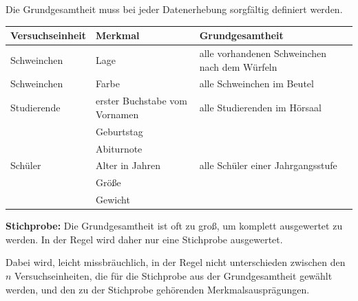 
Die \gls{Grundgesamtheit} muss bei jeder \gls{Datenerhebung} sorgfältig definiert werden.

\begin{mytable}
    \begin{tabular}{lll}
        \hline
        \textbf{Versuchseinheit} & \textbf{Merkmal}              & \textbf{Grundgesamtheit}                      \\
        \hline
        Schweinchen              & Lage                          & alle vorhandenen Schweinchen nach dem Würfeln \\
        Schweinchen              & Farbe                         & alle Schweinchen im Beutel                    \\
        Studierende              & erster Buchstabe vom Vornamen & alle Studierenden im Hörsaal                  \\
        & Geburtstag                    &                                               \\
        & Abiturnote                    &                                               \\
        Schüler                  & Alter in Jahren               & alle Schüler einer Jahrgangsstufe             \\
        & Größe                         &                                               \\
        & Gewicht                       &                                               \\
        \hline
    \end{tabular}
\end{mytable}

\textbf{Stichprobe:} Die \gls{Grundgesamtheit} ist oft zu groß, um komplett ausgewertet zu werden.
In der Regel wird daher nur eine Stichprobe ausgewertet.


Dabei wird, leicht missbräuchlich, in der Regel nicht unterschieden zwischen den $n$ \gls{Versuchseinheit}en, die
für die Stichprobe aus der \gls{Grundgesamtheit} gewählt werden, und den zu der Stichprobe gehörenden \gls{Merkmal}sausprägungen.


